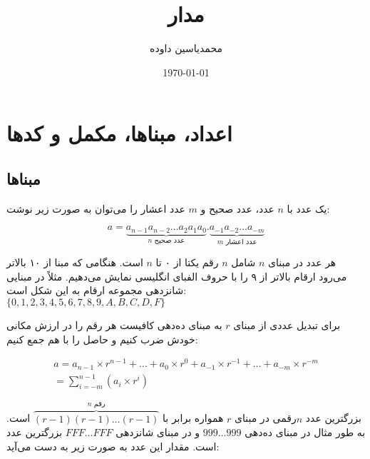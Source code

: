 \documentclass[a5paper]{article}
\author{محمدیاسین داوده}
\title{مدار}
\date{\today}
\begin{document}
\begin{titlingpage}
\maketitle


\tableofcontents
\end{titlingpage}

\section{اعداد، مبناها، مکمل و کدها}
\subsection{مبناها}
یک عدد با $n$ عدد، عدد صحیح و $m$ عدد اعشار را می‌توان به صورت زیر نوشت:

\begin{equation}
  a = \underbrace{a_{n-1}a_{n-2} \ldots a_2a_1a_0}_{\text{$n$ عدد صحیح}}.\underbrace{a_{-1}a_{-2} \ldots a_{-m}}_{\text{$m$ عدد اعشار}}
\end{equation}

هر عدد در مبنای $n$ شامل $n$ رقم یکتا از ۰ تا $n$ است.
هنگامی که مبنا از ۱۰ بالاتر می‌رود ارقام بالاتر از ۹ را با حروف الفبای انگلیسی نمایش می‌دهیم.
مثلاً در مبنایی شانزدهی مجموعه ارقام به این شکل است:\\
$\{0,1,2,3,4,5,6,7,8,9,A,B,C,D,F\}$

برای تبدیل عددی از مبنای $r$ به مبنای ده‌دهی کافیست هر رقم را در
ارزش مکانی خودش ضرب کنیم و حاصل را با هم جمع کنیم:

\begin{equation}\begin{split}
  a = a_{n-1} \times r^{n-1} + \ldots + a_{0} \times r^{0} + a_{-1} \times r^{-1} + \ldots + a_{-m} \times r^{-m}\\
  = \sum_{i=-m}^{n-1}(a_{i} \times r^{i})
\end{split}\end{equation}

بزرگترین عدد $n$رقمی در مبنای $r$ همواره برابر با $\overbrace{(r-1)(r-1)\ldots(r-1)}^{\text{$n$ رقم}}$ است.
به طور مثال در مبنای ده‌دهی $999\ldots999$ و در مبنای شانزدهی $FFF\ldots{}FFF$ بزرگترین عدد است.
مقدار این عدد به صورت زیر به دست می‌آید:
\end{document}
